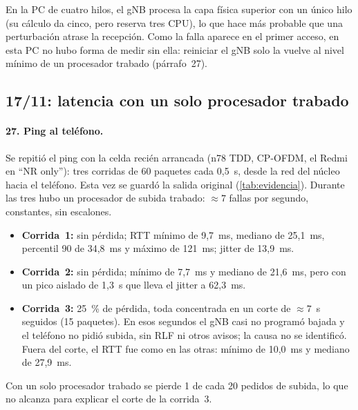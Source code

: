 En la PC de cuatro hilos, el gNB procesa la capa física superior con un único hilo (su cálculo da cinco, pero reserva tres CPU), lo que hace más probable que una perturbación atrase la recepción. Como la falla aparece en el primer acceso, en esta PC no hubo forma de medir sin ella: reiniciar el gNB solo la vuelve al nivel mínimo de un procesador trabado (párrafo~27).

\subsection{17/11: latencia con un solo procesador trabado}
\paragraph{27. Ping al teléfono.} Se repitió el ping con la celda recién arrancada (n78 TDD, CP-OFDM, el Redmi en ``NR only''): tres corridas de 60 paquetes cada 0,5~s, desde la red del núcleo hacia el teléfono. Esta vez se guardó la salida original (\cref{tab:evidencia}). Durante las tres hubo un procesador de subida trabado: $\approx 7$ fallas por segundo, constantes, sin escalones.
\begin{itemize}
  \item \textbf{Corrida~1:} sin pérdida; RTT mínimo de 9,7~ms, mediano de 25,1~ms, percentil 90 de 34,8~ms y máximo de 121~ms; jitter de 13,9~ms.
  \item \textbf{Corrida~2:} sin pérdida; mínimo de 7,7~ms y mediano de 21,6~ms, pero con un pico aislado de 1,3~s que lleva el jitter a 62,3~ms.
  \item \textbf{Corrida~3:} 25~\% de pérdida, toda concentrada en un corte de $\approx 7$~s seguidos (15 paquetes). En esos segundos el gNB casi no programó bajada y el teléfono no pidió subida, sin RLF ni otros avisos; la causa no se identificó. Fuera del corte, el RTT fue como en las otras: mínimo de 10,0~ms y mediano de 27,9~ms.
\end{itemize}
Con un solo procesador trabado se pierde 1 de cada 20 pedidos de subida, lo que no alcanza para explicar el corte de la corrida~3.

